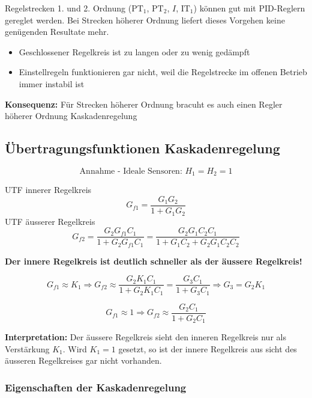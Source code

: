 Regelstrecken 1. und 2. Ordnung ($\text{PT}_1$, $\text{PT}_2$, $I$, $\text{IT}_1$) können gut mit PID-Reglern gereglet werden. 
Bei Strecken höherer Ordnung liefert dieses Vorgehen keine genügenden Resultate mehr.

\begin{itemize}
    \item Geschlossener Regelkreis ist zu langen oder zu wenig gedämpft
    \item Einstellregeln funktionieren gar nicht, weil die Regelstrecke im offenen Betrieb immer instabil ist
\end{itemize}

\textbf{Konsequenz:} Für Strecken höherer Ordnung bracuht es auch einen Regler höherer Ordnung \textrightarrow Kaskadenregelung


\subsection{Übertragungsfunktionen Kaskadenregelung}

\begin{minipage}[c]{0.56\columnwidth}
    
    $$ \text{Annahme - Ideale Sensoren: } H_1 = H_2 = 1$$
    
\end{minipage}
\hfill
\begin{minipage}[c]{0.43\columnwidth}
    UTF innerer Regelkreis
    $$ G_{f1} = \frac{G_1 G_2}{1 + G_1 G_2} $$
    UTF äusserer Regelkreis
    $$ \textstyle{ G_{f2} = \frac{G_2 G_{f1} C_1}{1 + G_2 G_{f1} C_1} = \frac{G_2 G_1 C_2 C_1}{1 + G_1 C_2 + G_2 G_1 C_2 C_2}} $$
\end{minipage}

\vspace{0.2cm}
\textbf{Der innere Regelkreis ist deutlich schneller als der äussere Regelkreis!}

$$ G_{f1} \approx K_1 \Rightarrow G_{f2} \approx \frac{G_2 K_1 C_1}{1 + G_2 K_1 C_1} = \frac{G_3 C_1}{1 + G_3 C_1} \Rightarrow G_3 = G_2 K_1 $$

$$ G_{f1} \approx 1  \Rightarrow G_{f2} \approx \frac{G_2 C_1}{1 + G_2 C_1}  $$

\textbf{Interpretation:} Der äussere Regelkreis sieht den inneren Regelkreis nur als Verstärkung $K_1$. Wird $K_1 = 1$ gesetzt, so
ist der innere Regelkreis aus sicht des äusseren Regelkreises gar nicht vorhanden.


\subsubsection{Eigenschaften der Kaskadenregelung}

